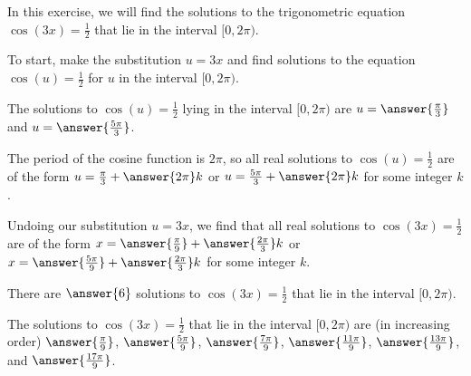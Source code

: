 \documentclass{ximera}
\author{Kenneth Berglund}
\begin{document}
\licenseSZ
In this exercise, we will find the solutions to the trigonometric equation $\cos(3x) = \frac{1}{2}$ that lie in the interval $[0, 2\pi)$.

To start, make the substitution $u = 3x$ and find solutions to the equation $\cos(u) = \frac{1}{2}$ for $u$ in the interval $[0, 2\pi)$. 

The solutions to $\cos(u) = \frac{1}{2}$ lying in the interval $[0, 2\pi)$ are $u = \answer{\frac{\pi}{3}}$ and $u = \answer{\frac{5\pi}{3}}$.

\begin{exercise}
The period of the cosine function is $2\pi$, so all real solutions to $\cos(u) = \frac{1}{2}$ are of the form $u = \frac{\pi}{3} + \answer{2\pi}k$ or $u = \frac{5\pi}{3} + \answer{2\pi}k$ for some integer $k$. 

\begin{exercise}
Undoing our substitution $u = 3x$, we find that all real solutions to $\cos(3x) = \frac{1}{2}$ are of the form $x = \answer{\frac{\pi}{9}} + \answer{\frac{2\pi}{3}}k$ or $x = \answer{\frac{5\pi}{9}} + \answer{\frac{2\pi}{3}}k$ for some integer $k$.

\begin{exercise}
There are $\answer{6}$ solutions to $\cos(3x) = \frac{1}{2}$ that lie in the interval $[0, 2\pi)$.

\begin{exercise}
The solutions to $\cos(3x) = \frac{1}{2}$ that lie in the interval $[0, 2\pi)$ are (in increasing order) $\answer{\frac{\pi}{9}}$, $\answer{\frac{5\pi}{9}}$, $\answer{\frac{7\pi}{9}}$, $\answer{\frac{11\pi}{9}}$, $\answer{\frac{13\pi}{9}}$, and $\answer{\frac{17\pi}{9}}$.


\end{exercise}
\end{exercise}
\end{exercise}
\end{exercise}
\end{document}
